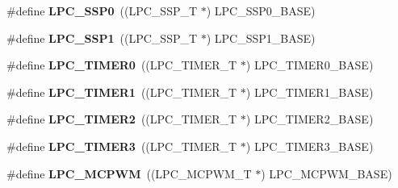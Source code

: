 \begin{DoxyCompactItemize}
\item 
\hypertarget{group___p_e_r_i_p_h__175_x__6_x___b_a_s_e_gac213e0325a8e8a972bd2e0dd6ccf353c}{\#define {\bfseries L\+P\+C\+\_\+\+S\+S\+P0}~((L\+P\+C\+\_\+\+S\+S\+P\+\_\+\+T              $\ast$) L\+P\+C\+\_\+\+S\+S\+P0\+\_\+\+B\+A\+S\+E)}\label{group___p_e_r_i_p_h__175_x__6_x___b_a_s_e_gac213e0325a8e8a972bd2e0dd6ccf353c}

\item 
\hypertarget{group___p_e_r_i_p_h__175_x__6_x___b_a_s_e_ga09c4610ada1d9aa18913963cbd1a6e52}{\#define {\bfseries L\+P\+C\+\_\+\+S\+S\+P1}~((L\+P\+C\+\_\+\+S\+S\+P\+\_\+\+T              $\ast$) L\+P\+C\+\_\+\+S\+S\+P1\+\_\+\+B\+A\+S\+E)}\label{group___p_e_r_i_p_h__175_x__6_x___b_a_s_e_ga09c4610ada1d9aa18913963cbd1a6e52}

\item 
\hypertarget{group___p_e_r_i_p_h__175_x__6_x___b_a_s_e_ga800f32a8a38d9e9c8f3b6ab161f6f2d2}{\#define {\bfseries L\+P\+C\+\_\+\+T\+I\+M\+E\+R0}~((L\+P\+C\+\_\+\+T\+I\+M\+E\+R\+\_\+\+T            $\ast$) L\+P\+C\+\_\+\+T\+I\+M\+E\+R0\+\_\+\+B\+A\+S\+E)}\label{group___p_e_r_i_p_h__175_x__6_x___b_a_s_e_ga800f32a8a38d9e9c8f3b6ab161f6f2d2}

\item 
\hypertarget{group___p_e_r_i_p_h__175_x__6_x___b_a_s_e_ga0d28200f11e877cece24025ebe7fe72a}{\#define {\bfseries L\+P\+C\+\_\+\+T\+I\+M\+E\+R1}~((L\+P\+C\+\_\+\+T\+I\+M\+E\+R\+\_\+\+T            $\ast$) L\+P\+C\+\_\+\+T\+I\+M\+E\+R1\+\_\+\+B\+A\+S\+E)}\label{group___p_e_r_i_p_h__175_x__6_x___b_a_s_e_ga0d28200f11e877cece24025ebe7fe72a}

\item 
\hypertarget{group___p_e_r_i_p_h__175_x__6_x___b_a_s_e_gae0a3c421e7e1ac3ffd7e740e33387dc5}{\#define {\bfseries L\+P\+C\+\_\+\+T\+I\+M\+E\+R2}~((L\+P\+C\+\_\+\+T\+I\+M\+E\+R\+\_\+\+T            $\ast$) L\+P\+C\+\_\+\+T\+I\+M\+E\+R2\+\_\+\+B\+A\+S\+E)}\label{group___p_e_r_i_p_h__175_x__6_x___b_a_s_e_gae0a3c421e7e1ac3ffd7e740e33387dc5}

\item 
\hypertarget{group___p_e_r_i_p_h__175_x__6_x___b_a_s_e_gab34ae64ea250497b5148b7ffb61d04f5}{\#define {\bfseries L\+P\+C\+\_\+\+T\+I\+M\+E\+R3}~((L\+P\+C\+\_\+\+T\+I\+M\+E\+R\+\_\+\+T            $\ast$) L\+P\+C\+\_\+\+T\+I\+M\+E\+R3\+\_\+\+B\+A\+S\+E)}\label{group___p_e_r_i_p_h__175_x__6_x___b_a_s_e_gab34ae64ea250497b5148b7ffb61d04f5}

\item 
\hypertarget{group___p_e_r_i_p_h__175_x__6_x___b_a_s_e_ga6fe8e415821195a786b3f0dc5e7fc9fa}{\#define {\bfseries L\+P\+C\+\_\+\+M\+C\+P\+W\+M}~((L\+P\+C\+\_\+\+M\+C\+P\+W\+M\+\_\+\+T            $\ast$) L\+P\+C\+\_\+\+M\+C\+P\+W\+M\+\_\+\+B\+A\+S\+E)}\label{group___p_e_r_i_p_h__175_x__6_x___b_a_s_e_ga6fe8e415821195a786b3f0dc5e7fc9fa}


\end{DoxyCompactItemize}
